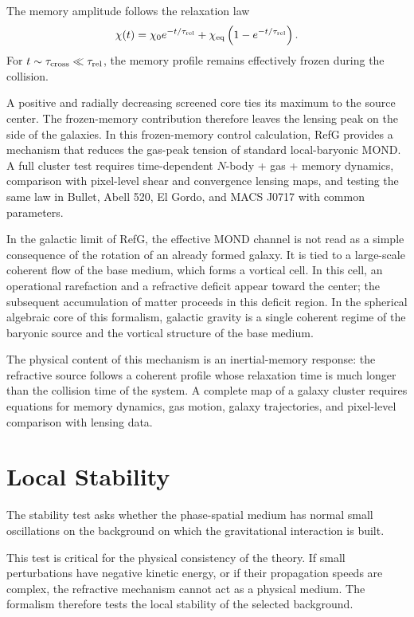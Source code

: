 \documentclass[12pt]{article}
\begin{document}
The memory amplitude follows the relaxation law
\begin{equation}
\chi(t)=\chi_0e^{-t/\tau_{\rm rel}}
+\chi_{\rm eq}\left(1-e^{-t/\tau_{\rm rel}}\right).
\end{equation}
For $t\sim\tau_{\rm cross}\ll\tau_{\rm rel}$, the memory profile remains effectively frozen during the collision.

A positive and radially decreasing screened core ties its maximum to the source center. The frozen-memory contribution therefore leaves the lensing peak on the side of the galaxies. In this frozen-memory control calculation, RefG provides a mechanism that reduces the gas-peak tension of standard local-baryonic MOND. A full cluster test requires time-dependent $N$-body + gas + memory dynamics, comparison with pixel-level shear and convergence lensing maps, and testing the same law in Bullet, Abell 520, El Gordo, and MACS J0717 with common parameters.

In the galactic limit of RefG, the effective MOND channel is not read as a simple consequence of the rotation of an already formed galaxy. It is tied to a large-scale coherent flow of the base medium, which forms a vortical cell. In this cell, an operational rarefaction and a refractive deficit appear toward the center; the subsequent accumulation of matter proceeds in this deficit region. In the spherical algebraic core of this formalism, galactic gravity is a single coherent regime of the baryonic source and the vortical structure of the base medium.

The physical content of this mechanism is an inertial-memory response: the refractive source follows a coherent profile whose relaxation time is much longer than the collision time of the system. A complete map of a galaxy cluster requires equations for memory dynamics, gas motion, galaxy trajectories, and pixel-level comparison with lensing data.

\section{Local Stability}

The stability test asks whether the phase-spatial medium has normal small oscillations on the background on which the gravitational interaction is built.

This test is critical for the physical consistency of the theory. If small perturbations have negative kinetic energy, or if their propagation speeds are complex, the refractive mechanism cannot act as a physical medium. The formalism therefore tests the local stability of the selected background.
\end{document}

